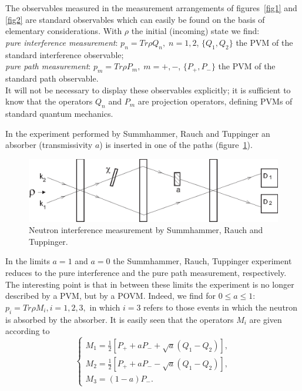 \documentclass[12pt]{article}
\begin{document}
{The observables measured in the measurement arrangements of
figures~\ref{fig1} and \ref{fig2} are standard observables which
can easily be found on the basis of elementary
considerations\cite{MuMa90}. With $\rho$ the initial (incoming) state we find: \\
\noindent \textit{pure interference measurement}: $p_n = Tr \rho
Q_n,\;n=1,2$, $\{Q_1,Q_2\}$ the PVM of the standard
interference observable;\\
\noindent \textit{pure path measurement}: $p_m = Tr \rho P_m,\;
m=+,-$, $\{P_+,P_-\}$ the PVM of the standard path observable.
\\It will not be necessary to display these observables
explicitly; it is sufficient to know that the operators $Q_n$ and
$P_m$ are projection operators, defining PVMs of standard quantum
mechanics.

In the experiment performed by Summhammer, Rauch and
Tuppinger\cite{SuRaTu} an absorber (transmissivity $a$) is
inserted in one of the paths (figure~\ref{fig3}).
\begin{figure}
\centerline{\includegraphics[width=5in]{muijn101a.eps}}
 \caption{Neutron interference measurement by
Summhammer, Rauch and Tuppinger.}
 \label{fig3}
\end{figure}
In the limits $a=1$ and $a=0$ the Summhammer, Rauch, Tuppinger
experiment reduces to the pure interference and the pure path
measurement, respectively. The interesting point is that in
between these limits the experiment is no longer described by a
PVM, but by a POVM. Indeed, we find for $0\leq a\leq 1$: $p_i = Tr
\rho M_i, i=1,2,3,$ in which $i=3$ refers to those events in which
the neutron is absorbed by the absorber. It is easily
seen\cite{MuMa90} that the operators $M_i$ are given according to
\begin{equation}\label{5}\left\{\begin{array}{l}
 M_1=\frac{1}{2}[P_++aP_- + \sqrt{a}(Q_1-Q_2)],\\
 M_2=\frac{1}{2}[P_++aP_- -\sqrt{a}(Q_1-Q_2)],\\
 M_{3}=(1-a)P_-.
 \end{array}\right. \end{equation}

}
\end{document}
